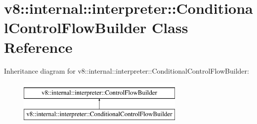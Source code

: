 \hypertarget{classv8_1_1internal_1_1interpreter_1_1ConditionalControlFlowBuilder}{}\section{v8\+:\+:internal\+:\+:interpreter\+:\+:Conditional\+Control\+Flow\+Builder Class Reference}
\label{classv8_1_1internal_1_1interpreter_1_1ConditionalControlFlowBuilder}
Inheritance diagram for v8\+:\+:internal\+:\+:interpreter\+:\+:Conditional\+Control\+Flow\+Builder\+:\begin{figure}[H]
\begin{center}
\leavevmode
\includegraphics[height=2.000000cm]{classv8_1_1internal_1_1interpreter_1_1ConditionalControlFlowBuilder}
\end{center}
\end{figure}
